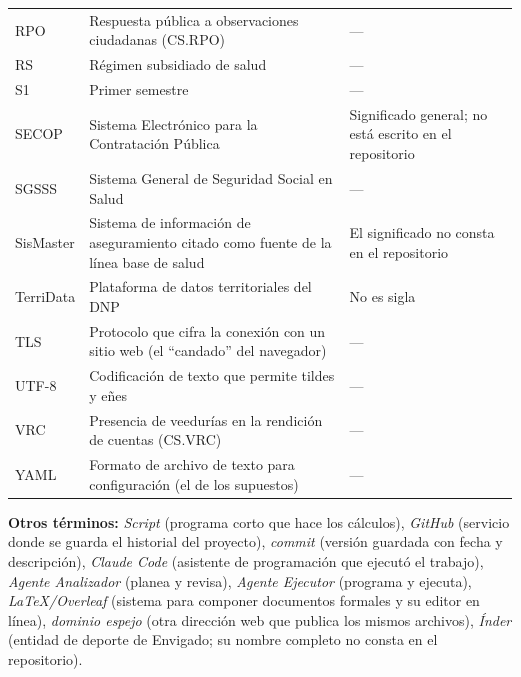 \documentclass[11pt,letterpaper]{article}
\begin{document}
{\begin{xltabular}{\linewidth}{L{2.56cm}L{8.91cm}L{4.46cm}}
RPO & Respuesta pública a observaciones ciudadanas (CS.RPO) & --- \\
RS & Régimen subsidiado de salud & --- \\
S1 & Primer semestre & --- \\
SECOP & Sistema Electrónico para la Contratación Pública & Significado general; no está escrito en el repositorio \\
SGSSS & Sistema General de Seguridad Social en Salud & --- \\
SisMaster & Sistema de información de aseguramiento citado como fuente de la línea base de salud & El significado no consta en el repositorio \\
TerriData & Plataforma de datos territoriales del DNP & No es sigla \\
TLS & Protocolo que cifra la conexión con un sitio web (el ``candado'' del navegador) & --- \\
UTF-8 & Codificación de texto que permite tildes y eñes & --- \\
VRC & Presencia de veedurías en la rendición de cuentas (CS.VRC) & --- \\
YAML & Formato de archivo de texto para configuración (el de los supuestos) & --- \\
\end{xltabular}
}

\textbf{Otros términos:} \emph{Script} (programa corto que hace los cálculos), \emph{GitHub} (servicio donde se guarda el historial del proyecto), \emph{commit} (versión guardada con fecha y descripción), \emph{Claude Code} (asistente de programación que ejecutó el trabajo), \emph{Agente Analizador} (planea y revisa), \emph{Agente Ejecutor} (programa y ejecuta), \emph{LaTeX/Overleaf} (sistema para componer documentos formales y su editor en línea), \emph{dominio espejo} (otra dirección web que publica los mismos archivos), \emph{Índer} (entidad de deporte de Envigado; su nombre completo no consta en el repositorio).
\end{document}
